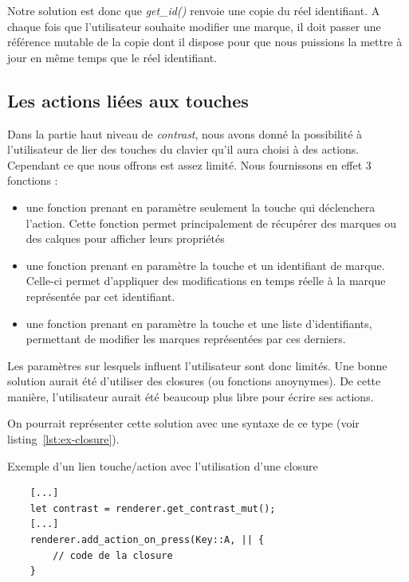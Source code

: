 \documentclass[12pt]{article}
\begin{document}
Notre solution est donc que \textit{get\_id()} renvoie une copie du réel identifiant. A chaque
fois que l'utilisateur souhaite modifier une marque, il doit passer une référence mutable
de la copie dont il dispose pour que nous puissions la mettre à jour en même temps que
le réel identifiant.

\subsection{Les actions liées aux touches}

Dans la partie haut niveau de \textit{contrast}, nous avons donné la possibilité à
l'utilisateur de lier des touches du clavier qu'il aura choisi à des actions.
Cependant ce que nous offrons est assez limité. Nous fournissons en effet 3 fonctions :
\begin{itemize}
\item une fonction prenant en paramètre seulement la touche qui déclenchera l'action.
Cette fonction permet principalement de récupérer des marques ou des calques pour
afficher leurs propriétés
\item une fonction prenant en paramètre la touche et un identifiant de marque. Celle-ci
permet d'appliquer des modifications en temps réelle à la marque représentée par cet
identifiant.
\item une fonction prenant en paramètre la touche et une liste d'identifiants, permettant de modifier les marques représentées par ces derniers.
\end{itemize}

Les paramètres sur lesquels influent l'utilisateur sont donc limités.
Une bonne solution aurait été d'utiliser des closures (ou fonctions anoynymes). De cette
manière, l'utilisateur aurait été beaucoup plus libre pour écrire ses actions.

On pourrait représenter cette solution avec une syntaxe de ce type
(voir listing~\ref{lst:ex-closure}).
\begin{listing}[H]
    \caption{Exemple d'un lien touche/action avec l'utilisation d'une closure}
    \begin{verbatim}
    [...]
    let contrast = renderer.get_contrast_mut();
    [...]
    renderer.add_action_on_press(Key::A, || {
        // code de la closure
    }
    \end{verbatim}
    \label{lst:ex-closure}
\end{listing}
\end{document}
